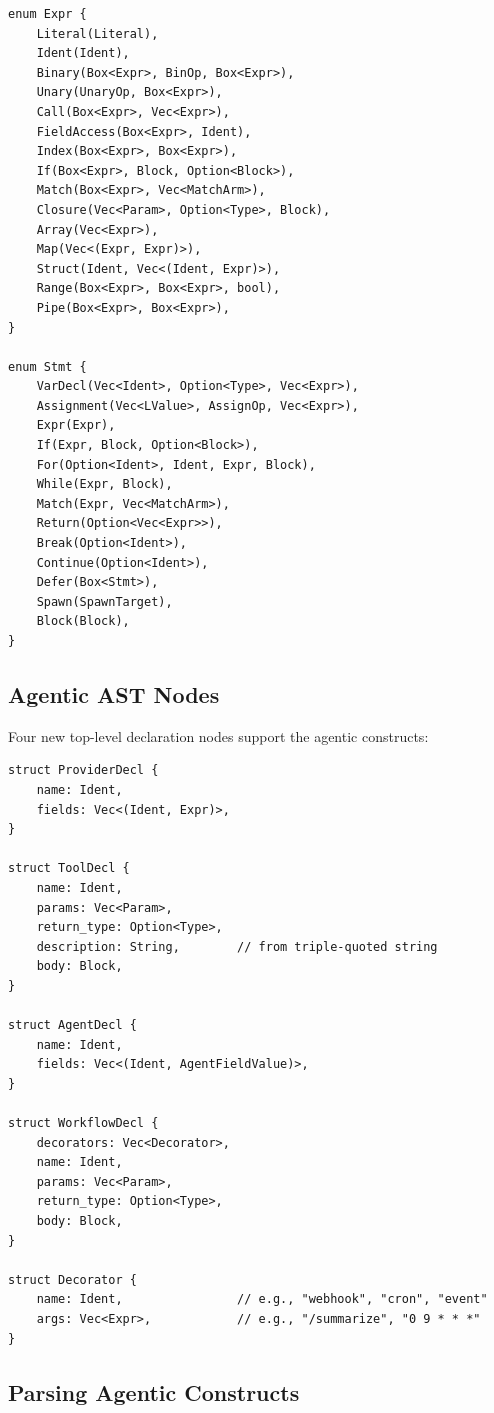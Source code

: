 \begin{lstlisting}[language={}]
enum Expr {
    Literal(Literal),
    Ident(Ident),
    Binary(Box<Expr>, BinOp, Box<Expr>),
    Unary(UnaryOp, Box<Expr>),
    Call(Box<Expr>, Vec<Expr>),
    FieldAccess(Box<Expr>, Ident),
    Index(Box<Expr>, Box<Expr>),
    If(Box<Expr>, Block, Option<Block>),
    Match(Box<Expr>, Vec<MatchArm>),
    Closure(Vec<Param>, Option<Type>, Block),
    Array(Vec<Expr>),
    Map(Vec<(Expr, Expr)>),
    Struct(Ident, Vec<(Ident, Expr)>),
    Range(Box<Expr>, Box<Expr>, bool),
    Pipe(Box<Expr>, Box<Expr>),
}

enum Stmt {
    VarDecl(Vec<Ident>, Option<Type>, Vec<Expr>),
    Assignment(Vec<LValue>, AssignOp, Vec<Expr>),
    Expr(Expr),
    If(Expr, Block, Option<Block>),
    For(Option<Ident>, Ident, Expr, Block),
    While(Expr, Block),
    Match(Expr, Vec<MatchArm>),
    Return(Option<Vec<Expr>>),
    Break(Option<Ident>),
    Continue(Option<Ident>),
    Defer(Box<Stmt>),
    Spawn(SpawnTarget),
    Block(Block),
}
\end{lstlisting}

\subsection{Agentic AST Nodes}

Four new top-level declaration nodes support the agentic constructs:

\begin{lstlisting}[language={}]
struct ProviderDecl {
    name: Ident,
    fields: Vec<(Ident, Expr)>,
}

struct ToolDecl {
    name: Ident,
    params: Vec<Param>,
    return_type: Option<Type>,
    description: String,        // from triple-quoted string
    body: Block,
}

struct AgentDecl {
    name: Ident,
    fields: Vec<(Ident, AgentFieldValue)>,
}

struct WorkflowDecl {
    decorators: Vec<Decorator>,
    name: Ident,
    params: Vec<Param>,
    return_type: Option<Type>,
    body: Block,
}

struct Decorator {
    name: Ident,                // e.g., "webhook", "cron", "event"
    args: Vec<Expr>,            // e.g., "/summarize", "0 9 * * *"
}
\end{lstlisting}

\subsection{Parsing Agentic Constructs}

